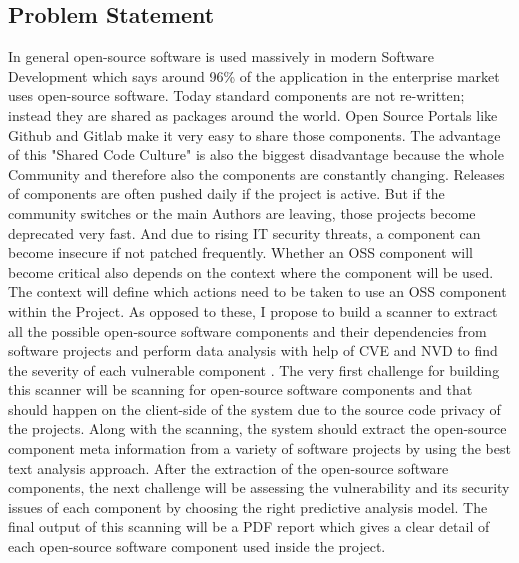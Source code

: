 \subsection{Problem Statement}
In general open-source software is used massively in modern Software Development which says around 96\% of the application in the enterprise market uses open-source software. Today standard components are not re-written; instead they are shared as packages around the world. Open Source Portals like Github and Gitlab make it very easy to share those components. The advantage of this "Shared Code Culture" is also the biggest disadvantage because the whole Community and therefore also the components are constantly changing. Releases of components are often pushed daily if the project is active. But if the community switches or the main Authors are leaving, those projects become deprecated very fast. And due to rising IT security threats, a component can become insecure if not patched frequently. Whether an \acs{OSS} component will become critical also depends on the context where the component will be used. The context will define which actions need to be taken to use an \acs{OSS} component within the Project.  As opposed to these, I propose to build a scanner to extract all the possible open-source software components and their dependencies from software projects and perform data analysis with help of \acs{CVE} and \acs{NVD} to find the severity of each vulnerable component \cite{RaLo2016}. The very first challenge for building this scanner will be scanning for open-source software components and that should happen on the client-side of the system due to the source code privacy of the projects. Along with the scanning, the system should extract the open-source component meta information from a variety of software projects by using the best text analysis approach. After the extraction of the open-source software components, the next challenge will be assessing the vulnerability and its security issues of each component by choosing the right predictive analysis model. The final output of this scanning will be a PDF report which gives a clear detail of each open-source software component used inside the project.